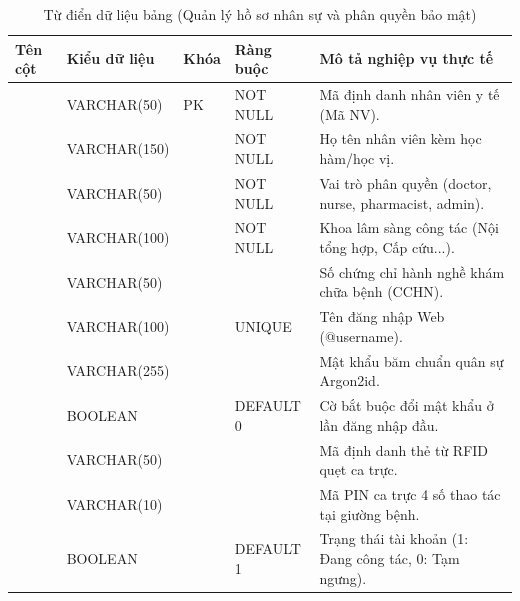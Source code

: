 \begin{table}[htbp]
\centering
\small
\begin{tabularx}{\textwidth}{L{3.5cm} L{2.2cm} C{1.2cm} C{1.8cm} Y}
\toprule
\textbf{Tên cột} & \textbf{Kiểu dữ liệu} & \textbf{Khóa} & \textbf{Ràng buộc} & \textbf{Mô tả nghiệp vụ thực tế} \\
\midrule
{} & VARCHAR(50) & PK & NOT NULL & Mã định danh nhân viên y tế (Mã NV). \\
 & VARCHAR(150) & & NOT NULL & Họ tên nhân viên kèm học hàm/học vị. \\
 & VARCHAR(50) & & NOT NULL & Vai trò phân quyền (doctor, nurse, pharmacist, admin). \\
 & VARCHAR(100) & & NOT NULL & Khoa lâm sàng công tác (Nội tổng hợp, Cấp cứu...). \\
 & VARCHAR(50) & & & Số chứng chỉ hành nghề khám chữa bệnh (CCHN). \\
 & VARCHAR(100) & & UNIQUE & Tên đăng nhập Web (@username). \\
 & VARCHAR(255) & & & Mật khẩu băm chuẩn quân sự Argon2id. \\
 & BOOLEAN & & DEFAULT 0 & Cờ bắt buộc đổi mật khẩu ở lần đăng nhập đầu. \\
 & VARCHAR(50) & & & Mã định danh thẻ từ RFID quẹt ca trực. \\
 & VARCHAR(10) & & & Mã PIN ca trực 4 số thao tác tại giường bệnh. \\
 & BOOLEAN & & DEFAULT 1 & Trạng thái tài khoản (1: Đang công tác, 0: Tạm ngưng). \\
\bottomrule
\end{tabularx}
\caption{Từ điển dữ liệu bảng  (Quản lý hồ sơ nhân sự và phân quyền bảo mật)}
\end{table}

